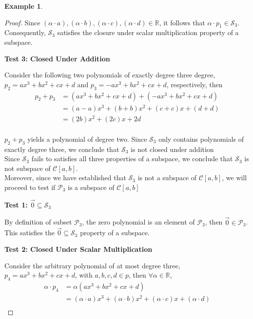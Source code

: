 \documentclass{book}
\theoremstyle{definition}
\newtheorem{example}{Example}[definition]
\theoremstyle{remark}
\newcommand{\bb}[1]{\mathbb{#1}}
\newcommand{\cc}[1]{\mathcal{#1}}
\newcommand{\m}{\cdot}
\begin{document}
\begin{example}
\begin{proof}
            Since $(\alpha \m a), (\alpha \m b), (\alpha \m c), (\alpha \m d) \in \bb{R}$, it follows that $\alpha \m p_1 \in \cc{S}_3$. Consequently, $\cc{S}_3$ satisfies the closure under scalar multiplication property of a subspace. \\
        
            
        \begin{flushleft} \textbf{Test 3: Closed Under Addition} \end{flushleft}
            Consider the following two polynomials of exactly degree three degree, $p_2 = ax^3 + bx^2 + cx + d$ and $p_3 = -ax^3 + bx^2 + cx + d$, respectively, then
                \begin{align*}
                    p_2 + p_3 & = (ax^3 + bx^2 + cx + d) + (-ax^3 + bx^2 + cx + d) \\
                        & = (a - a)x^3 + (b+b)x^2 + (c+c)x + (d+d) \\
                        & = (2b)x^2 + (2c)x + 2d \\
                \end{align*}

            $p_2 + p_3$ yields a polynomial of degree two. Since $\cc{S}_3$ only contains polynomials of exactly degree three, we conclude that $\cc{S}_3$ is not closed under addition \\
            
        Since $\cc{S}_3$ fails to satisfies all three properties of a subspace, we conclude that $\cc{S}_3$ is not subspace of $\cc{C}[a,b]$. \\ 
    
    Moreover, since we have established that $\cc{S}_3$ is not a subspace of $\cc{C}[a,b]$, we will proceed to test if $\cc{P}_3$ is a subspace of $\cc{C}[a,b]$ \\
        
        \begin{flushleft} \textbf{Test 1: $\vec{0} \subseteq \cc{S}_3$} \end{flushleft}
            By definition of subset $\cc{P}_3$, the zero polynomial is an element of $\cc{P}_3$, then $ \vec{0} \in \cc{P}_3$. This satisfies the $\vec{0} \subseteq \cc{S}_3$ property of a subspace. \\
        
        \begin{flushleft} \textbf{Test 2: Closed Under Scalar Multiplication} \end{flushleft}        
            Consider the arbitrary polynomial of at most degree three, $p_4 = ax^3 + bx^2 + cx + d$, with $a,b,c,d \in p$, then $\forall \alpha \in \bb{R}$,
                \begin{align*}
                    \alpha \m p_4 & = \alpha(ax^3 + bx^2 + cx + d) \\
                        & = (\alpha \m a)x^3 + (\alpha \m b)x^2 + (\alpha \m c)x + (\alpha \m d) \\
                \end{align*}
            

\end{proof}
\end{example}
\end{document}
